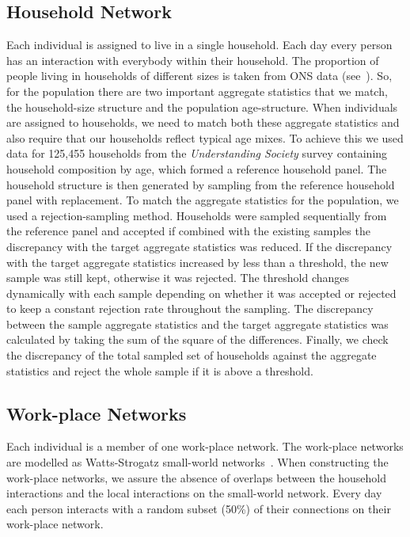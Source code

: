 \documentclass[12pt, oneside]{amsart}   	%
\begin{document}
\subsection{Household Network}\label{section_ibm_network_houshold}
Each individual is assigned to live in a single household.  
Each day every person has an interaction with everybody within their household.
The proportion of people living in households of different sizes is taken from ONS data (see~).
So, for the population there are two important aggregate statistics that we match, the household-size structure and the population age-structure.
When individuals are assigned to households, we need to match both these aggregate statistics and also require that our households reflect typical age mixes.
To achieve this we used data for 125,455 households from the {\it Understanding Society} survey \citep{essex2019} containing household composition by age, which formed a reference household panel.
The household structure is then generated by sampling from the reference household panel with replacement.
To match the aggregate statistics for the population, we used a rejection-sampling method.
Households were sampled sequentially from the reference panel and accepted if combined with the existing samples the discrepancy with the target aggregate statistics was reduced.
If the discrepancy with the target aggregate statistics increased by less than a threshold, the new sample was still kept, otherwise it was rejected.
The threshold changes dynamically with each sample depending on whether it was accepted or rejected to keep a constant rejection rate throughout the sampling.
The discrepancy between the sample aggregate statistics and the target aggregate statistics was calculated by taking the sum of the square of the differences. 
Finally, we check the discrepancy of the total sampled set of households against the aggregate statistics and reject the whole sample if it is above a threshold.

\subsection{Work-place Networks}\label{section_ibm_network_workplace}
Each individual is a member of one work-place network. 
The work-place networks are modelled as Watts-Strogatz small-world networks~\citep{watts1998collective}.
When constructing the work-place networks, we assure the absence of overlaps between the household interactions and the local interactions on the small-world network.
Every day each person interacts with a random subset (50\%) of their connections on their work-place network.
\end{document}

